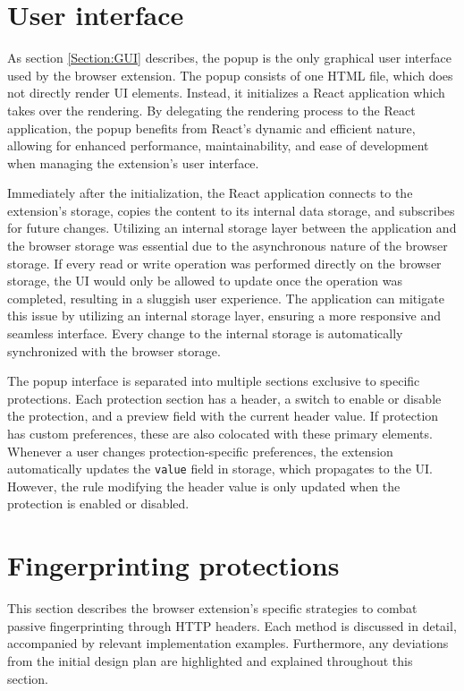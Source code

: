 
\section{User interface}

As section \ref{Section:GUI} describes, the popup is the only graphical user interface used by the browser extension. The popup consists of one HTML file, which does not directly render UI elements. Instead, it initializes a React application which takes over the rendering. By delegating the rendering process to the React application, the popup benefits from React's dynamic and efficient nature, allowing for enhanced performance, maintainability, and ease of development when managing the extension's user interface.

Immediately after the initialization, the React application connects to the extension's storage, copies the content to its internal data storage, and subscribes for future changes. Utilizing an internal storage layer between the application and the browser storage was essential due to the asynchronous nature of the browser storage. If every read or write operation was performed directly on the browser storage, the UI would only be allowed to update once the operation was completed, resulting in a sluggish user experience. The application can mitigate this issue by utilizing an internal storage layer, ensuring a more responsive and seamless interface. Every change to the internal storage is automatically synchronized with the browser storage.

The popup interface is separated into multiple sections exclusive to specific protections. Each protection section has a header, a switch to enable or disable the protection, and a preview field with the current header value. If protection has custom preferences, these are also colocated with these primary elements. Whenever a user changes protection-specific preferences, the extension automatically updates the \texttt{value} field in storage, which propagates to the UI. However, the rule modifying the header value is only updated when the protection is enabled or disabled.

\section{Fingerprinting protections}

This section describes the browser extension's specific strategies to combat passive fingerprinting through HTTP headers. Each method is discussed in detail, accompanied by relevant implementation examples. Furthermore, any deviations from the initial design plan are highlighted and explained throughout this section.


